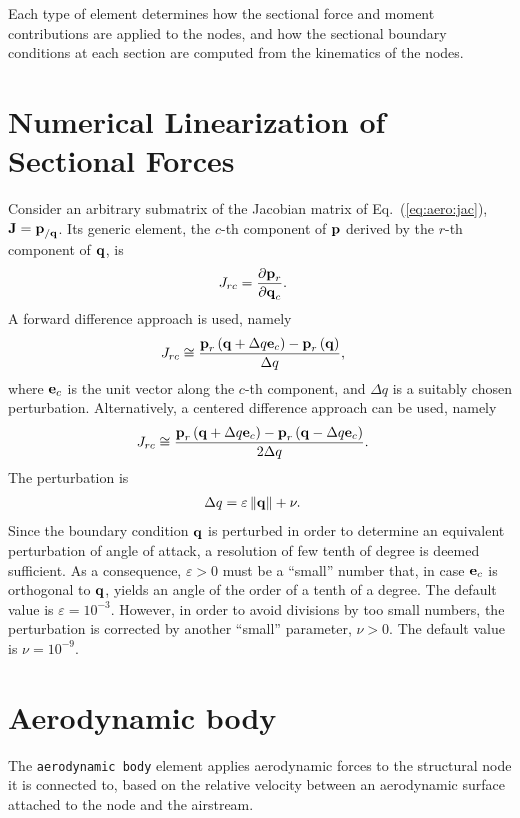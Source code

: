 Each type of element determines how the sectional force and moment
contributions are applied to the nodes, and how the sectional
boundary conditions at each section are computed from the kinematics
of the nodes.



\section{Numerical Linearization of Sectional Forces}
Consider an arbitrary submatrix of the Jacobian matrix
of Eq.~(\ref{eq:aero:jac}), $\bm{\mathbf{J}}=\bm{\mathbf{p}}_{/\bm{\mathbf{q}}}$.
Its generic element, the $c$-th component of $\bm{\mathbf{p}}$
derived by the $r$-th component of $\bm{\mathbf{q}}$, is
\begin{align}
	J_{rc} &= \frac{\partial\bm{\mathbf{p}}_r}{\partial\bm{\mathbf{q}}_c}
	.
\end{align}
A forward difference approach is used, namely
\begin{align}
	J_{rc} &\cong \frac{
		\bm{\mathbf{p}}_r\left( \bm{\mathbf{q}} + \Delta q \bm{\mathbf{e}}_c \right)
		- \bm{\mathbf{p}}_r\left( \bm{\mathbf{q}} \right)
	}{
		\Delta q
	}
	,
\end{align}
where $\bm{\mathbf{e}}_c$ is the unit vector along the $c$-th component,
and $\Delta q$ is a suitably chosen perturbation.
Alternatively, a centered difference approach can be used, namely
\begin{align}
	J_{rc} &\cong \frac{
		\bm{\mathbf{p}}_r\left( \bm{\mathbf{q}} + \Delta q \bm{\mathbf{e}}_c \right)
		- \bm{\mathbf{p}}_r\left( \bm{\mathbf{q}} - \Delta q \bm{\mathbf{e}}_c \right)
	}{
		2 \Delta q
	}
	.
\end{align}
The perturbation is
\begin{align}
	\Delta q &= \varepsilon \left\| \bm{\mathbf{q}} \right\| + \nu
	.
\end{align}
Since the boundary condition $\bm{\mathbf{q}}$ is perturbed in order to determine
an equivalent perturbation of angle of attack, a resolution of few tenth
of degree is deemed sufficient.
As a consequence, $\varepsilon>0$ must be a ``small'' number
that, in case $\bm{\mathbf{e}}_c$ is orthogonal to $\bm{\mathbf{q}}$,
yields an angle of the order of a tenth of a degree.
The default value is $\varepsilon=10^{-3}$.
However, in order to avoid divisions by too small numbers,
the perturbation is corrected by another ``small'' parameter,
$\nu>0$.
The default value is $\nu=10^{-9}$.



\section{Aerodynamic body}
The \texttt{aerodynamic body} element applies aerodynamic forces
to the structural node it is connected to,
based on the relative velocity between an aerodynamic surface attached 
to the node and the airstream.

